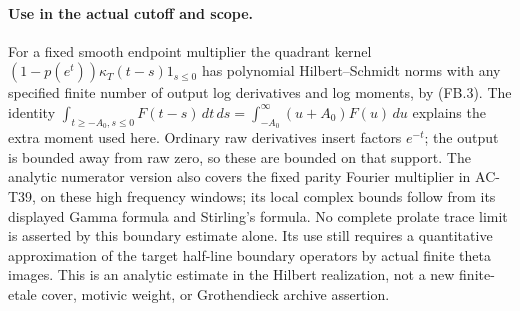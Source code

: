 \paragraph{Use in the actual cutoff and scope.}
For a fixed smooth endpoint multiplier the quadrant kernel
$(1-p(e^t))\kappa_T(t-s)1_{s\leq0}$ has polynomial
Hilbert--Schmidt norms with any specified finite number
of output log derivatives and log moments, by (FB.3).
The identity
$\int_{t\geq-A_0,s\leq0}F(t-s)\,dt\,ds
=\int_{-A_0}^\infty(u+A_0)F(u)\,du$
explains the extra moment used here.
Ordinary raw derivatives insert factors $e^{-t}$;
the output is bounded away from raw zero, so these
are bounded on that support.
The analytic numerator version also covers the fixed
parity Fourier multiplier in AC-T39, on these high
frequency windows; its local complex bounds follow
from its displayed Gamma formula and Stirling's formula.
No complete prolate trace limit is asserted by this
boundary estimate alone.  Its use still requires a
quantitative approximation of the target half-line
boundary operators by actual finite theta images.
This is an analytic estimate in the Hilbert realization,
not a new finite-etale cover, motivic weight, or
Grothendieck archive assertion.
